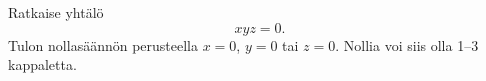 

\begin{esimerkki} Ratkaise yhtälö
    \[xyz=0.\]
Tulon nollasäännön perusteella $x=0$, $y=0$ tai $z=0$. Nollia voi siis
olla 1--3 kappaletta.
\end{esimerkki}

